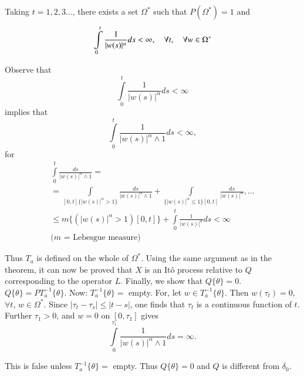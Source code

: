Taking $t=1,2,3\ldots$, there exists a set $\Omega^{*}$ such that
$P(\Omega^{*})=1$ and
$$
\int\limits^{t}_{0}\frac{1}{|w(s)|^{\alpha}}ds<\infty,\quad \forall t,\quad
\forall w\in \Omega^{*}
$$

Observe that
$$
\int\limits^{t}_{0}\frac{1}{|w(s)|^{\alpha}}ds<\infty
$$
implies that
$$
\int\limits^{t}_{0}\frac{1}{|w(s)|^{\alpha}\wedge 1}ds<\infty,
$$\pageoriginale
for
\begin{gather*}
\int\limits^{t}_{0}\frac{ds}{|w(s)|^{\alpha}\wedge 1}=\\
=\int\limits_{[0,t]\{|w(s)|^{\alpha}>1\}}\frac{ds}{|w(s)|^{\alpha}\wedge
  1}+ \int\limits_{\{|w(s)|^{\alpha}\leq
  1\}[0,t]}\frac{ds}{|w(s)|^{\alpha}},\ldots\\
\leq
m\{(|w(s)|^{\alpha}>1)[0,t]\}+\int\limits^{t}_{0}\frac{1}{|w(s)|^{\alpha}}ds<\infty
\\
\text{($m$ = Lebesgue measure)}
\end{gather*}

Thus $T_{a}$ is defined on the whole of $\Omega^{*}$. Using the same
argument as in the theorem, it can now be proved that $X$ is an It\^o
process relative to $Q$ corresponding to the operator $L$. Finally, we
show that $Q\{\theta\}=0$. $Q\{\theta\}=PT^{-1}_{a}\{\theta\}$. Now:
$T^{-1}_{a}\{\theta\}=$ empty. For, let $w\in
T^{-1}_{a}\{\theta\}$. Then $w(\tau_{t})=0$, $\forall t$, $w\in
\Omega^{*}$. Since $|\tau_{t}-\tau_{s}|\leq |t-s|$, one finds that
$\tau_{t}$ is a continuous function of $t$. Further $\tau_{1}>0$, and
$w=0$ on $[0,\tau_{1}]$ gives
$$
\int\limits^{\tau_{1}}_{0}\frac{1}{|w(s)|^{\alpha}\wedge 1}ds=\infty.
$$

This is false unless $T^{-1}_{a}\{\theta\}=$ empty. Thus
$Q\{\theta\}=0$ and $Q$ is different from $\delta_{0}$.
